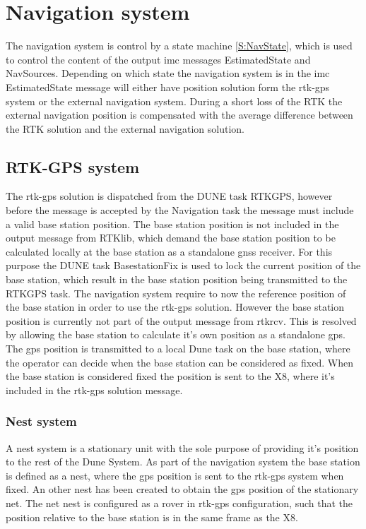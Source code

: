 \section{Navigation system}
The navigation system is control by a state machine \ref{S:NavState}, which is used to control the content of the output \gls{imc} messages EstimatedState and NavSources. Depending on which state the navigation system is in the \gls{imc} EstimatedState message will either have position solution form the \gls{rtk-gps} system or the external navigation system. During a short loss of the RTK the external navigation position is compensated with the average difference between the RTK solution and the external navigation solution.
\subsection{RTK-GPS system}
The \gls{rtk-gps} solution is dispatched from the DUNE task RTKGPS, however before the message is accepted by the Navigation task the message must include a valid base station position. The base station position is not included in the output message from RTKlib, which demand the base station position to be calculated locally at the base station as a standalone \gls{gnss} receiver. For this purpose the DUNE task BasestationFix is used to lock the current position of the base station, which result in the base station position being transmitted to the RTKGPS task.
The navigation system require to now the reference position of the base station in order to use the \gls{rtk-gps} solution. However the base station position is currently not part of the output message from rtkrcv. This is resolved by allowing the base station to calculate it's own position as a standalone \gls{gps}. The \gls{gps} position is transmitted to a local Dune task on the base station, where the operator can decide when the base station can be considered as fixed. When the base station is considered fixed the position is sent to the X8, where it's included in the \gls{rtk-gps} solution message.
\subsubsection{Nest system}
A nest system is a stationary unit with the sole purpose of providing it's position to the rest of the Dune System. As part of the navigation system the base station is defined as a nest, where the \gls{gps} position is sent to the \gls{rtk-gps} system when fixed.
An other nest has been created to obtain the \gls{gps} position of the stationary net. The net nest is configured as a rover in \gls{rtk-gps} configuration, such that the position relative to the base station is in the same frame as the X8.

